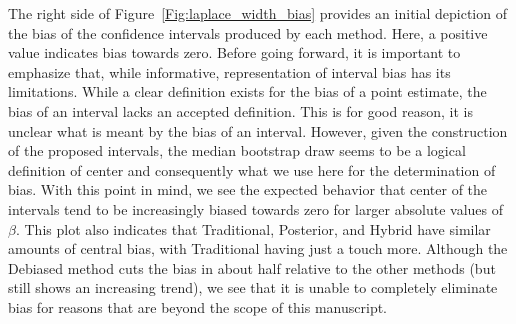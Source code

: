 The right side of Figure~\ref{Fig:laplace_width_bias} provides an initial depiction of the bias of the confidence intervals produced by each method. Here, a positive value indicates bias towards zero. Before going forward, it is important to emphasize that, while informative, representation of interval bias has its limitations. While a clear definition exists for the bias of a point estimate, the bias of an interval lacks an accepted definition. This is for good reason, it is unclear what is meant by the bias of an interval. However, given the construction of the proposed intervals, the median bootstrap draw seems to be a logical definition of center and consequently what we use here for the determination of bias. With this point in mind, we see the expected behavior that center of the intervals tend to be increasingly biased towards zero for larger absolute values of $\beta$. This plot also indicates that Traditional, Posterior, and Hybrid have similar amounts of central bias, with Traditional having just a touch more. Although the Debiased method cuts the bias in about half relative to the other methods (but still shows an increasing trend), we see that it is unable to completely eliminate bias for reasons that are beyond the scope of this manuscript.

